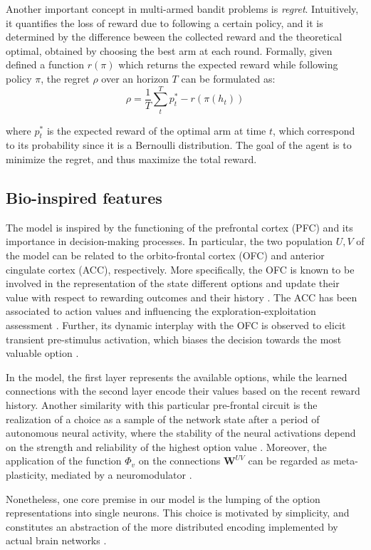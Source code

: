 Another important concept in multi-armed bandit problems is \textit{regret}. Intuitively, it quantifies the loss of reward due to following a certain policy, and it is determined by the difference beween the collected reward and the theoretical optimal, obtained by choosing the best arm at each round.
Formally, given defined a function $r(\pi)$ which returns the expected reward while following policy $\pi$, the regret $\rho$ over an horizon $T$ can be formulated as:
\begin{equation}
    \rho = \frac{1}{T}\sum^{T}_{t} p^{*}_{t} -r(\pi(h_{t}))
\end{equation}

\noindent where $p^{*}_{t}$ is the expected reward of the optimal arm at time $t$, which correspond to its probability since it is a Bernoulli distribution.
\noindent The goal of the agent is to minimize the regret, and thus maximize the total reward.





\subsection{Bio-inspired features}

The model is inspired by the functioning of the prefrontal cortex (PFC) and its importance in decision-making processes. In particular, the two population $U, V$ of the model can be related to the orbito-frontal cortex (OFC) and anterior cingulate cortex (ACC), respectively.
More specifically, the OFC is known to be involved in the representation of the state different options and update their value with respect to rewarding outcomes and their history \cite{lukChoiceCodingFrontal2013, kennerleyDecisionMakingReward2011a}.
The ACC has been associated to action values and influencing the exploration-exploitation assessment \cite{khamassiChapter22Medial2013}. Further, its dynamic interplay with the OFC is observed to elicit transient pre-stimulus activation, which biases the decision towards the most valuable option \cite{funahashiPrefrontalContributionDecisionMaking2017, marcosDeterminingMonkeyFree2016, balewskiValueDynamicsAffect2023}.

In the model, the first layer represents the available options, while the learned connections with the second layer encode their values based on the recent reward history.
Another similarity with this particular pre-frontal circuit is the realization of a choice as a sample of the network state after a period of autonomous neural activity, where the stability of the neural activations depend on the strength and reliability of the highest option value \cite{backmanEffectsWorkingMemoryTraining2011, enelStableDynamicRepresentations2020}.
Moreover, the application of the function $\Phi_{v}$ on the connections $\textbf{W}^{UV}$ can be regarded as meta-plasticity, mediated by a neuromodulator \cite{wangMetalearningNaturalArtificial2021}.

Nonetheless, one core premise in our model is the lumping of the option representations into single neurons. This choice is motivated by simplicity, and constitutes an abstraction of the more distributed encoding implemented by actual brain networks \cite{martinRepresentationObjectConcepts2007a}.

